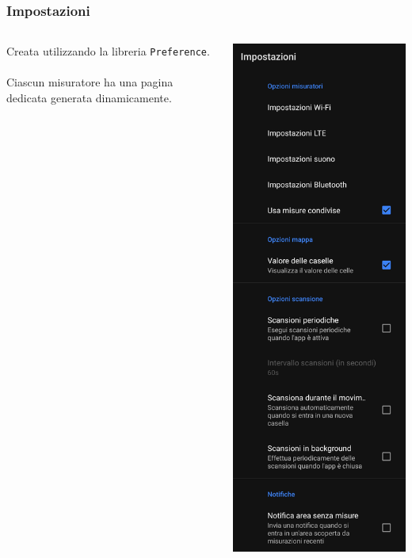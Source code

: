 \documentclass{beamer}
\begin{document}
\begin{frame}
    \frametitle{Impostazioni}

    \begin{columns}
        Creata utilizzando la libreria \texttt{Preference}.
        \\~\\
        Ciascun misuratore ha una pagina dedicata generata dinamicamente.

        \centering
        \includegraphics[width=0.70\linewidth]{./img/overview/settings1.jpg}
    \end{columns} 
\end{frame}
\end{document}
